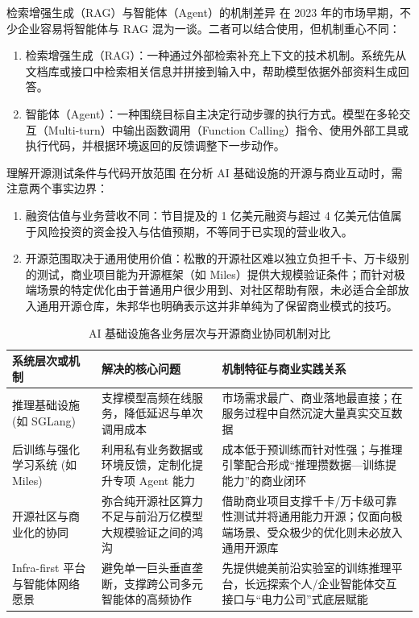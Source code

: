 \documentclass[UTF8,a4paper,11pt,fontset=fandol]{ctexart}
\begin{document}
\begin{knowledgebox}{检索增强生成（RAG）与智能体（Agent）的机制差异}
在 2023 年的市场早期，不少企业容易将智能体与 RAG 混为一谈。二者可以结合使用，但机制重心不同：
\begin{enumerate}
\item 检索增强生成（RAG）：一种通过外部检索补充上下文的技术机制。系统先从文档库或接口中检索相关信息并拼接到输入中，帮助模型依据外部资料生成回答。
\item 智能体（Agent）：一种围绕目标自主决定行动步骤的执行方式。模型在多轮交互（Multi-turn）中输出函数调用（Function Calling）指令、使用外部工具或执行代码，并根据环境返回的反馈调整下一步动作。
\end{enumerate}
\end{knowledgebox}
\begin{warningbox}{理解开源测试条件与代码开放范围}
在分析 AI 基础设施的开源与商业互动时，需注意两个事实边界：
\begin{enumerate}
\item 融资估值与业务营收不同：节目提及的 1 亿美元融资与超过 4 亿美元估值属于风险投资的资金投入与估值预期，不等同于已实现的营业收入。
\item 开源范围取决于通用使用价值：松散的开源社区难以独立负担千卡、万卡级别的测试，商业项目能为开源框架（如 Miles）提供大规模验证条件；而针对极端场景的特定优化由于普通用户很少用到、对社区帮助有限，未必适合全部放入通用开源仓库，朱邦华也明确表示这并非单纯为了保留商业模式的技巧。
\end{enumerate}
\end{warningbox}
\begin{table}[H]\centering\small
\caption{AI 基础设施各业务层次与开源商业协同机制对比}
\begin{tabular}{>{\raggedright\arraybackslash}p{\dimexpr(\linewidth-6\tabcolsep)/3\relax}>{\raggedright\arraybackslash}p{\dimexpr(\linewidth-6\tabcolsep)/3\relax}>{\raggedright\arraybackslash}p{\dimexpr(\linewidth-6\tabcolsep)/3\relax}}
\toprule
系统层次或机制 & 解决的核心问题 & 机制特征与商业实践关系\\\midrule
推理基础设施 (如 SGLang) & 支撑模型高频在线服务，降低延迟与单次调用成本 & 市场需求最广、商业落地最直接；在服务过程中自然沉淀大量真实交互数据\\[4pt]
后训练与强化学习系统 (如 Miles) & 利用私有业务数据或环境反馈，定制化提升专项 Agent 能力 & 成本低于预训练而针对性强；与推理引擎配合形成“推理攒数据—训练提能力”的商业闭环\\[4pt]
开源社区与商业化的协同 & 弥合纯开源社区算力不足与前沿万亿模型大规模验证之间的鸿沟 & 借助商业项目支撑千卡/万卡级可靠性测试并将通用能力开源；仅面向极端场景、受众极少的优化则未必放入通用开源库\\[4pt]
Infra-first 平台与智能体网络愿景 & 避免单一巨头垂直垄断，支撑跨公司多元智能体的高频协作 & 先提供媲美前沿实验室的训练推理平台，长远探索个人/企业智能体交互接口与“电力公司”式底层赋能\\[4pt]
\bottomrule\end{tabular}\end{table}
\end{document}
